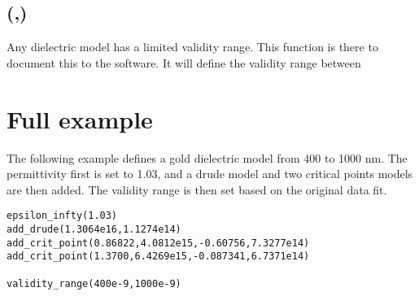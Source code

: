 \subsection[validity\_range]{(,)}

Any dielectric model has a limited validity range. This function is there to document this to the software. It will define the validity range between

\section{Full example}

The following example defines a gold dielectric model from 400 to 1000 nm. The permittivity first is set to 1.03, and a drude model and two critical points models are then added. The validity range is then set based on the original data fit.

\begin{lstlisting}
epsilon_infty(1.03)
add_drude(1.3064e16,1.1274e14)
add_crit_point(0.86822,4.0812e15,-0.60756,7.3277e14)
add_crit_point(1.3700,6.4269e15,-0.087341,6.7371e14)

validity_range(400e-9,1000e-9)
\end{lstlisting}